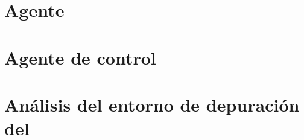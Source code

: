 \section{Agente }
\label{sec:ana_switch}

\section{Agente de control }
\label{sec:ana_controller}





\section{Análisis del entorno de depuración del }
\label{sec:ana_gdb}


